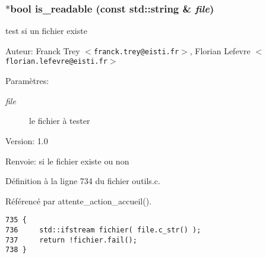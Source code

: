 \subsubsection{ $\ast$bool is\_\-readable (const std::string \& {\em file})}\label{outils_8c_2f8e7ba560d7f4e48910a60e6414ad6e}


test si un fichier existe 

\begin{Desc}
\item[Auteur:]Franck Trey $<${\tt franck.trey@eisti.fr}$>$, Florian Lefevre $<${\tt florian.lefevre@eisti.fr}$>$\end{Desc}
\begin{Desc}
\item[Param\`{e}tres:]
\begin{description}
\item[{\em file}]le fichier \`{a} tester\end{description}
\end{Desc}
\begin{Desc}
\item[Version:]1.0 \end{Desc}
\begin{Desc}
\item[Renvoie:]si le fichier existe ou non \end{Desc}


D\'{e}finition \`{a} la ligne 734 du fichier outils.c.

R\'{e}f\'{e}renc\'{e} par attente\_\-action\_\-accueil().

\begin{Code}\begin{verbatim}735 { 
736     std::ifstream fichier( file.c_str() ); 
737     return !fichier.fail(); 
738 } 
\end{verbatim}\end{Code}


